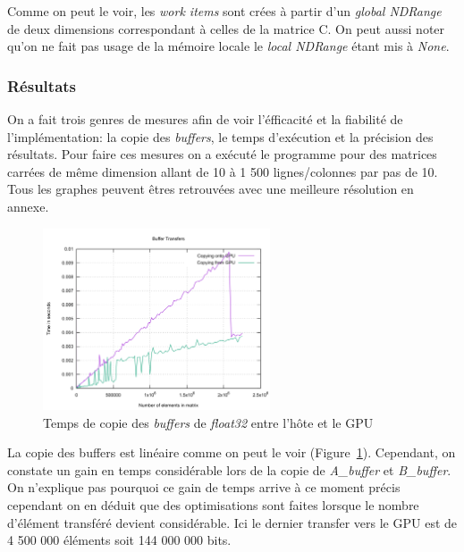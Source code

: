 Comme on peut le voir, les \textit{work items} sont crées à partir d'un 
\textit{global NDRange} de deux dimensions correspondant à celles de la 
matrice C. On peut aussi noter qu'on ne fait pas usage de la mémoire locale 
le \textit{local NDRange} étant mis à \textit{None}.

\subsubsection{Résultats}

On a fait trois genres de mesures afin de voir l'éfficacité et la fiabilité 
de l'implémentation: la copie des \textit{buffers}, le temps d'exécution et 
la précision des résultats. Pour faire ces mesures on a exécuté le programme 
pour des matrices carrées de même dimension allant de 10 à 1 500 lignes/colonnes par pas de 10. 
Tous les graphes peuvent êtres retrouvées avec une meilleure résolution en annexe.

\begin{figure}[H]
\begin{center}
    \includegraphics[width=0.6\textwidth]{../../resources/matrix_naive_buffer_transfer.png}
    \caption{Temps de copie des \textit{buffers} de \textit{float32} entre l'hôte et le GPU}
    \label{fig:buffer_transfer_naive}
\end{center}
\end{figure}

La copie des buffers est linéaire comme on peut le voir
(Figure~\ref{fig:buffer_transfer_naive}). Cependant, on constate un gain en 
temps considérable lors de la copie de \textit{A\_buffer} et \textit{B\_buffer}. 
On n'explique pas pourquoi ce gain de temps arrive à ce moment précis cependant 
on en déduit que des optimisations sont faites lorsque le nombre d'élément 
transféré devient considérable. Ici le dernier transfer vers le GPU est de 
4 500 000 éléments soit 144 000 000 bits.

